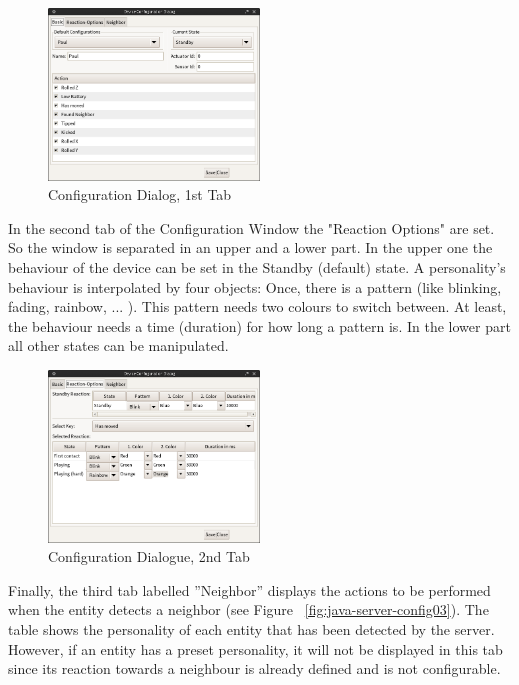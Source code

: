 \begin{figure}[h!]
 \centering
 \includegraphics[width= 0.5\textwidth, clip=true  ,keepaspectratio=true]{./pic/java-server-config01.png}
 \caption{Configuration Dialog, 1st Tab}
 \label{fig:java-server-config01}
\end{figure}

In the second tab of the Configuration Window the "Reaction Options" are set.\newline
So the window is separated in an upper and a lower part. In the upper one the behaviour of the device can be set in the Standby (default) state. A personality's behaviour is interpolated by four objects: Once, there is a pattern (like blinking, fading, rainbow, ... ). This pattern needs two colours to switch between. At least, the behaviour needs a time (duration) for how long a pattern is.\newline
In the lower part all other states can be manipulated.   


\begin{figure}[h!]
 \centering
 \includegraphics[width= 0.5\textwidth, clip=true  ,keepaspectratio=true]{./pic/java-server-config02.png}
 \caption{Configuration Dialogue, 2nd Tab}
 \label{fig:java-server-config02}
\end{figure}


Finally, the third tab labelled ''Neighbor'' displays the actions to be performed when the entity detects a neighbor (see Figure ~\ref{fig:java-server-config03}). The table shows the personality of each entity that has been detected by the server. However, if an entity has a preset personality, it will not be displayed in this tab since its reaction towards a neighbour is already defined and is not configurable. 

